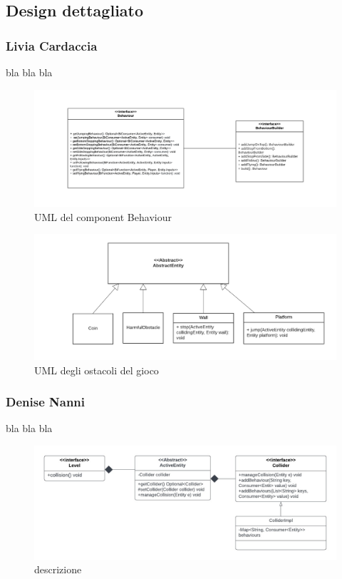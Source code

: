 \documentclass{article}
\begin{document}
\subsection{Design dettagliato}
\subsubsection{Livia Cardaccia}
bla bla bla
\begin{figure}[ht]
    \includegraphics[width=1\textwidth]{umlBehaviour.png}
    \caption{UML del component Behaviour}
    \label{fig:schgen}
\end{figure}
\begin{figure}[ht]
    \includegraphics[width=1\textwidth]{umlObstacles.png}
    \caption{UML degli ostacoli del gioco}
    \label{fig:schgen}
\end{figure}

\subsubsection{Denise Nanni}
bla bla bla
\begin{figure}[ht]
    \includegraphics[width=1\textwidth]{umlCollider.jpg}
    \caption{descrizione}
    \label{fig:schgen}
\end{figure}
\end{document}
